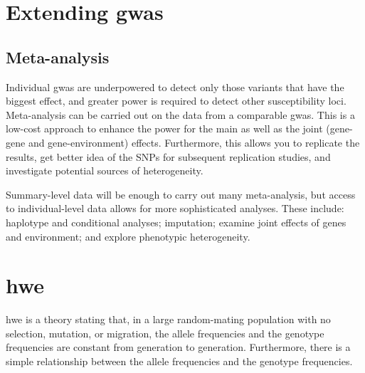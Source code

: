 \section{Extending \gls{gwas}}
\label{sec:extending_gwas}

\subsection{Meta-analysis}
\label{sub:meta_analysis}

Individual \gls{gwas} are underpowered to detect only those variants that have the biggest effect, and greater power is required to detect other susceptibility loci.
Meta-analysis can be carried out on the data from a comparable \gls{gwas}.
This is a low-cost approach to enhance the power for the main  as well as the joint (gene-gene and gene-environment) effects.
Furthermore, this allows you to replicate the results, get better idea of the SNPs for subsequent replication studies, and investigate potential sources of heterogeneity.





Summary-level data will be enough to carry out many meta-analysis, but access to individual-level data allows for more sophisticated analyses.
These include: haplotype and conditional analyses; imputation; examine joint effects of genes and environment; and explore phenotypic heterogeneity.









\section{\Acrfull{hwe}}
\label{sec:hwe}

\Gls{hwe} is a theory stating that, in a large random-mating population with no selection, mutation, or migration, the allele frequencies and the genotype frequencies are constant from generation to generation.
Furthermore, there is a simple relationship between the allele frequencies and the genotype frequencies.

